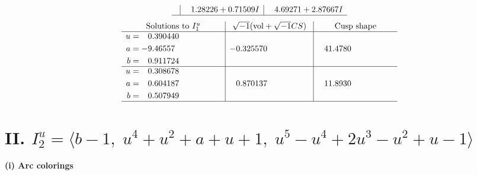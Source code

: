 \documentclass[1p]{elsarticle_modified}
\theoremstyle{definition}
\newcommand{\I}{\sqrt{-1}}
\begin{document}
$$\begin{array}{c|c|c}
 & \phantom{-}1.28226 + 0.71509 I & \phantom{-}4.69271 + 2.87667 I\\
 \hline 
 \end{array}$$\newpage$$\begin{array}{c|c|c}  
\text{Solutions to }I^u_{1}& \I (\text{vol} + \sqrt{-1}CS) & \text{Cusp shape}\\
 \hline 
\begin{aligned}
u &= \phantom{-}0.390440\phantom{ +0.000000I} \\
a &= -9.46557\phantom{ +0.000000I} \\
b &= \phantom{-}0.911724\phantom{ +0.000000I}\end{aligned}
 & -0.325570\phantom{ +0.000000I} & \phantom{-}41.4780\phantom{ +0.000000I} \\ \hline\begin{aligned}
u &= \phantom{-}0.308678\phantom{ +0.000000I} \\
a &= \phantom{-}0.604187\phantom{ +0.000000I} \\
b &= \phantom{-}0.507949\phantom{ +0.000000I}\end{aligned}
 & \phantom{-}0.870137\phantom{ +0.000000I} & \phantom{-}11.8930\phantom{ +0.000000I}\\
 \hline 
 \end{array}$$\newpage\newpage\renewcommand{\arraystretch}{1}
\centering \section*{II. $I^u_{2}= \langle b-1,\;u^4+u^2+a+u+1,\;u^5- u^4+2 u^3- u^2+u-1 \rangle$}
\flushleft \textbf{(i) Arc colorings}\\
\end{document}
